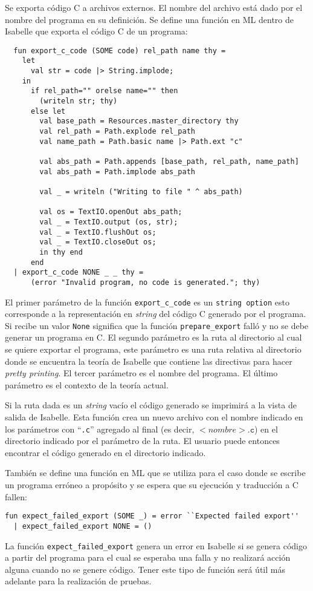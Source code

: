 Se exporta código C a archivos externos.
El nombre del archivo está dado por el nombre del programa en su definición.
Se define una función en ML dentro de Isabelle que exporta el código C de un programa:


\begin{lstlisting}
  fun export_c_code (SOME code) rel_path name thy =
    let
      val str = code |> String.implode;
    in
      if rel_path="" orelse name="" then
        (writeln str; thy)
      else let
        val base_path = Resources.master_directory thy
        val rel_path = Path.explode rel_path
        val name_path = Path.basic name |> Path.ext "c"

        val abs_path = Path.appends [base_path, rel_path, name_path]
        val abs_path = Path.implode abs_path

        val _ = writeln ("Writing to file " ^ abs_path)

        val os = TextIO.openOut abs_path;
        val _ = TextIO.output (os, str);
        val _ = TextIO.flushOut os;
        val _ = TextIO.closeOut os;
        in thy end
      end
  | export_c_code NONE _ _ thy =
      (error "Invalid program, no code is generated."; thy)
\end{lstlisting}

El primer parámetro de la función \verb|export_c_code| es un \verb|string option| esto corresponde a la representación en \textit{string} del código C generado por el programa.
Si recibe un valor \verb|None| significa que la función \verb|prepare_export| falló y no se debe generar un programa en C.
El segundo parámetro es la ruta al directorio al cual se quiere exportar el programa, este parámetro es una ruta relativa al directorio donde se encuentra la teoría de Isabelle que contiene las directivas para hacer \textit{pretty printing}.
El tercer parámetro es el nombre del programa.
El último parámetro es el contexto de la teoría actual.

Si la ruta dada es un \textit{string} vacío el código generado se imprimirá a la vista de salida de Isabelle.
Esta función crea un nuevo archivo con el nombre indicado en los parámetros con ``\verb|.c|'' agregado al final (es decir, $<nombre>\mathtt{.c}$) en el directorio indicado por el parámetro de la ruta.
El usuario puede entonces encontrar el código generado en el directorio indicado.

También se define una función en ML que se utiliza para el caso donde se escribe un programa erróneo a propósito y se espera que su ejecución y traducción a C fallen:

\begin{lstlisting}
fun expect_failed_export (SOME _) = error ``Expected failed export''
  | expect_failed_export NONE = ()
\end{lstlisting}

La función \verb|expect_failed_export| genera un error en Isabelle si se genera código a partir del programa para el cual se esperaba una falla y no realizará acción alguna cuando no se genere código.
Tener este tipo de función será útil más adelante para la realización de pruebas.
